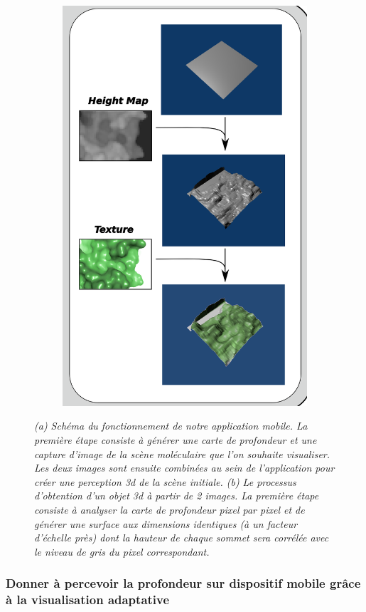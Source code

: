 \begin{figure}[h]
\begin{subfigure}{.5\textwidth}
  {\includegraphics[width=.75\linewidth]{./figures/ch3/heightmap_texture_unity}}
    \caption{}
  \label{Fig:heightmap_texture_unity}
\end{subfigure}
\caption[(a) Schéma du fonctionnement de notre application mobile. (b) Processus d'obtention d'un objet 3d à partir de 2 images.]{{\it (a) Schéma du fonctionnement de notre application mobile. La première étape consiste à générer une carte de profondeur et une capture d'image de la scène moléculaire que l'on souhaite visualiser. Les deux images sont ensuite combinées au sein de l'application pour créer une perception 3d de la scène initiale.
(b) Le processus d'obtention d'un objet 3d à partir de 2 images. La première étape consiste à analyser la carte de profondeur pixel par pixel et de générer une surface aux dimensions identiques (à un facteur d'échelle près) dont la hauteur de chaque sommet sera corrélée avec le niveau de gris du pixel correspondant.}}
\end{figure}

\subsubsection{Donner à percevoir la profondeur sur dispositif mobile grâce à la visualisation adaptative}

